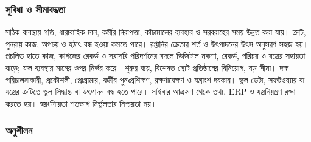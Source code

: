 \subsubsection{সুবিধা ও সীমাবদ্ধতা}
সঠিক ব্যবস্থায় গতি, ধারাবাহিক মান, কর্মীর নিরাপত্তা, কাঁচামালের ব্যবহার ও সরবরাহের সময় উন্নত করা যায়। ত্রুটি, পুনরায় কাজ, অপচয় ও হঠাৎ বন্ধ হওয়া কমতে পারে। রপ্তানির ক্রেতার শর্ত ও উৎপাদনের উৎস অনুসরণ সহজ হয়। প্রচলিত হাতে কাজ, কাগজের রেকর্ড ও সরাসরি পরিদর্শনের বদলে ডিজিটাল নকশা, রেকর্ড, পরিচয় ও যন্ত্রের সহায়তা বাড়ে; ফল ব্যবস্থার মানের ওপর নির্ভর করে।
শুরুর ব্যয়, বিশেষত ছোট প্রতিষ্ঠানের বিনিয়োগ, বড় সীমা। দক্ষ পরিচালনাকারী, প্রকৌশলী, প্রোগ্রামার, কর্মীর পুনঃপ্রশিক্ষণ, রক্ষণাবেক্ষণ ও যন্ত্রাংশ দরকার। ভুল ডেটা, সফটওয়্যার বা যন্ত্রের ত্রুটিতে ভুল সিদ্ধান্ত বা উৎপাদন বন্ধ হতে পারে। সাইবার আক্রমণ থেকে তথ্য, ERP ও যন্ত্রনিয়ন্ত্রণ রক্ষা করতে হয়। স্বয়ংক্রিয়তা শতভাগ নির্ভুলতার নিশ্চয়তা নয়।
\subsubsection{অনুশীলন}

